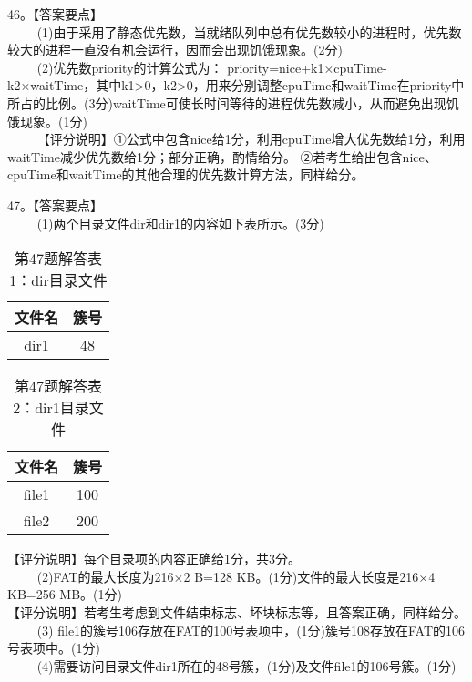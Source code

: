 46。【答案要点】 \\
$\qquad$ (1)由于采用了静态优先数，当就绪队列中总有优先数较小的进程时，优先数较大的进程一直没有机会运行，因而会出现饥饿现象。(2分) \\
$\qquad$ (2)优先数priority的计算公式为：
priority=nice+k1×cpuTime-k2×waitTime，其中k1>0，k2>0，用来分别调整cpuTime和waitTime在priority中所占的比例。(3分)waitTime可使长时间等待的进程优先数减小，从而避免出现饥饿现象。(1分) \\
$\qquad$ 【评分说明】①公式中包含nice给1分，利用cpuTime增大优先数给1分，利用waitTime减少优先数给1分；部分正确，酌情给分。
②若考生给出包含nice、cpuTime和waitTime的其他合理的优先数计算方法，同样给分。

47。【答案要点】 \\
$\qquad$ (1)两个目录文件dir和dir1的内容如下表所示。(3分)
\begin{table}[ht]
\centering
\caption{第47题解答表1：dir目录文件}\label{tab_CSN16_6}
\begin{tabular}{|c|c|}
\hline
文件名 & 簇号 \\
\hline
dir1 & 48 \\
\hline
\end{tabular}
\end{table}

\begin{table}[ht]
\centering
\caption{第47题解答表2：dir1目录文件}\label{tab_CSN16_7}
\begin{tabular}{|c|c|}
\hline
文件名 & 簇号 \\
\hline
file1 & 100 \\
\hline
file2 & 200 \\
\hline
\end{tabular}
\end{table}
【评分说明】每个目录项的内容正确给1分，共3分。 \\
$\qquad$ (2)FAT的最大长度为216×2 B=128 KB。(1分)文件的最大长度是216×4 KB=256 MB。(1分) \\
【评分说明】若考生考虑到文件结束标志、坏块标志等，且答案正确，同样给分。 \\
$\qquad$ (3) file1的簇号106存放在FAT的100号表项中，(1分)簇号108存放在FAT的106号表项中。(1分) \\
$\qquad$ (4)需要访问目录文件dir1所在的48号簇，(1分)及文件file1的106号簇。(1分)
